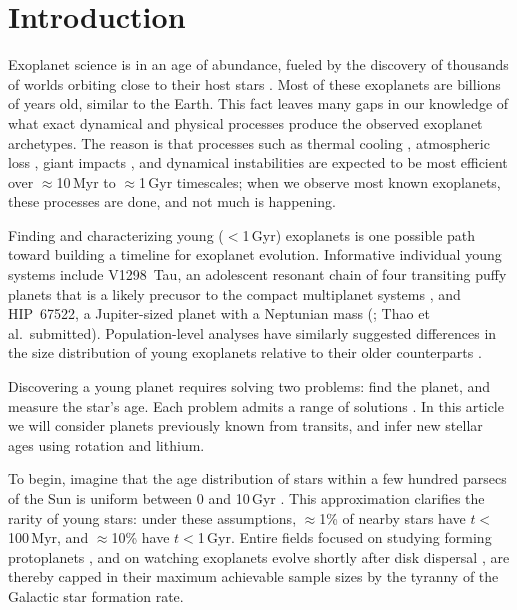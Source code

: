 \documentclass[11pt,twocolumn,tighten]{aastex63}
\begin{document}
\section{Introduction}
\label{sec:intro}

Exoplanet science is in an age of abundance, fueled by the discovery
of thousands of worlds orbiting close to their host stars
\citep{Borucki10,2015JATIS...1a4003R}.  Most of these exoplanets are
billions of years old, similar to the Earth.  This fact leaves many
gaps in our knowledge of what exact dynamical and physical processes
produce the observed exoplanet archetypes.    The reason is that
processes such as thermal cooling \citep{2007ApJ...659.1661F},
atmospheric loss \citep{2019AREPS..47...67O}, giant impacts
\citep{2014prpl.conf..595R}, and dynamical instabilities
\citep{2017MNRAS.470.1750I} are expected to be most efficient over
$\approx$10\,Myr to $\approx$1\,Gyr timescales; when we observe most
known exoplanets, these processes are done, and not much is happening.

Finding and characterizing young ($<$1\,Gyr) exoplanets is one 
possible path toward building a timeline for exoplanet evolution.
Informative individual young systems include V1298~Tau, an adolescent
resonant chain of four transiting puffy planets that is a likely
precusor to the compact multiplanet systems \citep{David_2019}, and
HIP~67522, a Jupiter-sized planet with a Neptunian mass
(\citealt{Rizzuto_2020}; Thao et al.~submitted).
Population-level analyses have similarly suggested differences in the
size distribution of young exoplanets relative to their older
counterparts
\citep{Berger_2020b_rpage,David_2021,Sandoval_2021,2023AJ....166..248C,2024arXiv240303261V}.

Discovering a young planet requires solving two problems: find the
planet, and measure the star's age.  Each problem admits a range of
solutions \citep[e.g.][]{2008Sci...322.1348M,2012ApJ...756L..33Q}.  In
this article we will consider planets previously known from
transits, and infer new stellar ages using rotation and lithium.

To begin, imagine that the age distribution of stars within a few
hundred parsecs of the Sun is uniform between 0 and 10\,Gyr
\citep[e.g.][]{Nordstrom_2004}.  This approximation clarifies the
rarity of young stars: under these assumptions, $\approx$1\% of nearby
stars have $t$$<$100\,Myr, and $\approx$10\% have $t$$<$1\,Gyr.
Entire fields focused on studying forming protoplanets
\citep{2018A&A...617A..44K}, and on watching exoplanets evolve shortly
after disk dispersal \citep[e.g.][]{2022MNRAS.512.5067K}, are thereby
capped in their maximum achievable sample sizes by the tyranny of the
Galactic star formation rate.
\end{document}
